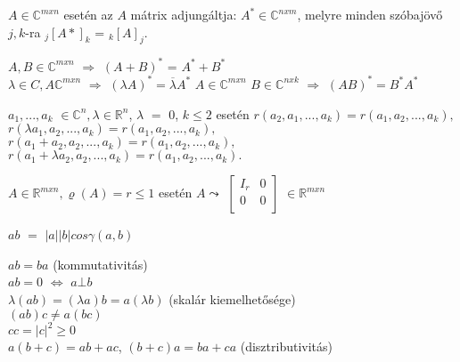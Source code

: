 	\begin{frame}
		\begin{tcolorbox}[title={Def.: Adjugált}]
			 $A  \in \mathbb{C}^{m x n}$ esetén az $A$ mátrix adjungáltja: $A^{{\ast}} \in \mathbb{C}^{n x m}$, melyre minden szóbajövő $j, k$-ra $_{j} [A{\ast}]_k$ = $_{k} [A]_j$.
		\end{tcolorbox}
		
		\begin{tcolorbox}[title={Tétel.: Az adjungálás kapcsolata a mátrixműveletekkel}]
			$A, B \in \mathbb{C}^{m x n}$ $\Rightarrow$ $(A + B)^*$ = $A^* + B^*$\\
			$\lambda \in C, A \mathbb{C}^{m x n}$  $\Rightarrow$ $({\lambda}A)^* = \overline{{\lambda}}A^*$
			$A \in \mathbb{C}^{m x n}$ $B \in \mathbb{C}^{n x k}$ $\Rightarrow$ $(AB)^* = B^*A^*$
		\end{tcolorbox}
		
		\begin{tcolorbox}[title={Tétel: Rangtartó átalakítások}]
			$a_1, ..., a_k$ $\in \mathbb{C}^{n}, {\lambda} \in \mathbb{R}^n$, ${\lambda}$ $=$ $0$, $k \leq 2$ esetén
			$r(a_2, a_1, ..., a_k) = r(a_1, a_2, ..., a_k),$\\
			$r({\lambda}a_1, a_2, ..., a_k) = r(a_1, a_2, ..., a_k),$\\
			$r(a_1 + a_2, a_2, ..., a_k) = r(a_1, a_2, ..., a_k),$\\
			$r(a_1 + {\lambda}a_2, a_2, ..., a_k) = r(a_1, a_2, ..., a_k).$
		\end{tcolorbox}
		
		\begin{tcolorbox}[title={Tétel: Rangtartó átalakítások és mátrixok}]
			$A  \in \mathbb{R}^{m x n}, {\varrho}(A) = r \leq 1$ esetén $A \leadsto$ $\begin{bmatrix} 
  				I_r & 0  \\ 
  				0 & 0 \\
			\end{bmatrix}$ $\in \mathbb{R}^{m x n}$
		\end{tcolorbox}	
		
		\begin{tcolorbox}[title={Def.: Geometriai vektorok skaláris szorzata tulajdonságai}]
			$ab$ $=$ $|a| |b| cos {\gamma}(a, b)$\\
		\end{tcolorbox}	
		
		\begin{tcolorbox}[title={Def.: Skaláris szorzat, geometriai vektorokra}]
			$ab = ba$ (kommutativitás)\\
			$ab = 0$ $\iff$ $a \bot b$\\
			${\lambda}(ab) = ({\lambda}a)b = a({\lambda}b)$ (skalár kiemelhetősége)\\
			$(ab)c \neq a(bc)$\\
			$cc = |c|^2 \geq 0$\\
			$a(b + c) = ab + ac$, $(b + c)a = ba + ca$ (disztributivitás)
		\end{tcolorbox}	
	\end{frame}
	
